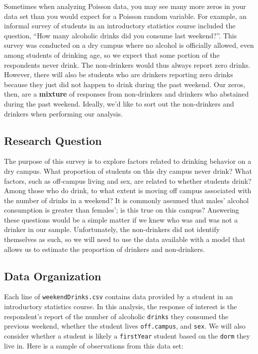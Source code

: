 \documentclass[
]{krantz}
\begin{document}
Sometimes when analyzing Poisson data, you may see many more zeros in your data set than you would expect for a Poisson random variable. For example, an informal survey of students in an introductory statistics course included the question, ``How many alcoholic drinks did you consume last weekend?''. This survey was conducted on a dry campus where no alcohol is officially allowed, even among students of drinking age, so we expect that some portion of the respondents never drink. The non-drinkers would thus always report zero drinks. However, there will also be students who are drinkers reporting zero drinks because they just did not happen to drink during the past weekend. Our zeros, then, are a \textbf{mixture} of responses from non-drinkers and drinkers who abstained during the past weekend. Ideally, we'd like to sort out the non-drinkers and drinkers when performing our analysis.

\subsection{Research Question}\label{research-question}

The purpose of this survey is to explore factors related to drinking behavior on a dry campus. What proportion of students on this dry campus never drink? What factors, such as off-campus living and sex, are related to whether students drink? Among those who do drink, to what extent is moving off campus associated with the number of drinks in a weekend? It is commonly assumed that males' alcohol consumption is greater than females'; is this true on this campus? Answering these questions would be a simple matter if we knew who was and was not a drinker in our sample. Unfortunately, the non-drinkers did not identify themselves as such, so we will need to use the data available with a model that allows us to estimate the proportion of drinkers and non-drinkers.

\subsection{Data Organization}\label{data-organization-2}

Each line of \texttt{weekendDrinks.csv} contains data provided by a student in an introductory statistics course. In this analysis, the response of interest is the respondent's report of the number of alcoholic \texttt{drinks} they consumed the previous weekend, whether the student lives \texttt{off.campus}, and \texttt{sex}. We will also consider whether a student is likely a \texttt{firstYear} student based on the \texttt{dorm} they live in. Here is a sample of observations from this data set:
\end{document}
